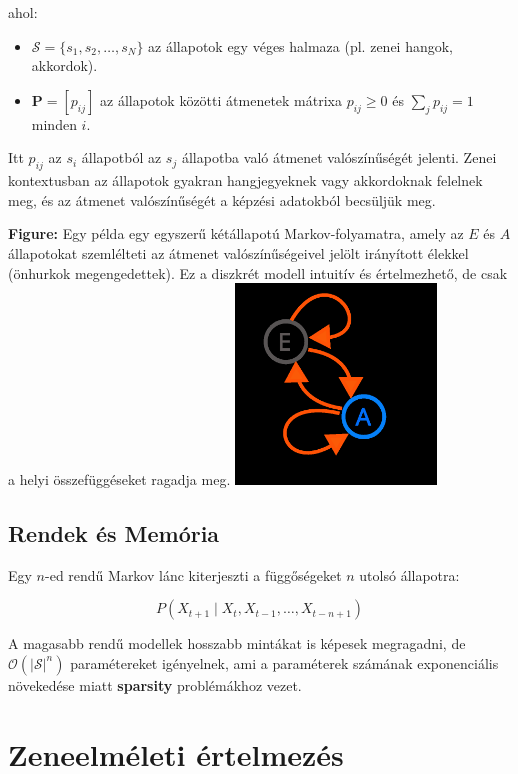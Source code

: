 ahol:
\begin{itemize}
    \item \( \mathcal{S} = \{s_1, s_2, \dots, s_N\} \) az állapotok egy véges halmaza (pl. zenei hangok, akkordok).
    \item \( \mathbf{P} = [p_{ij}] \) az állapotok közötti átmenetek mátrixa \( p_{ij} \geq 0 \) és \( \sum_j p_{ij} = 1 \) minden \( i \).
\end{itemize}

Itt \( p_{ij} \) az \( s_i \) állapotból az \( s_j \) állapotba való átmenet valószínűségét jelenti. Zenei kontextusban az állapotok gyakran hangjegyeknek vagy akkordoknak felelnek meg, és az átmenet valószínűségét a képzési adatokból becsüljük meg.

\vspace{1em}
\noindent\textbf{Figure:} Egy példa egy egyszerű kétállapotú Markov-folyamatra, amely az \( E \) és \( A \) állapotokat szemlélteti az átmenet valószínűségeivel jelölt irányított élekkel (önhurkok megengedettek). Ez a diszkrét modell intuitív és értelmezhető, de csak a helyi összefüggéseket ragadja meg. \hfill
\includegraphics[width=0.4\textwidth]{images/markov.png}
\label{fig:markov}
\vspace{1em}

\subsection{Rendek és Memória}

Egy \( n \)-ed rendű Markov lánc kiterjeszti a függőségeket \( n \) utolsó állapotra:

\[
P(X_{t+1} \mid X_t, X_{t-1}, \dots, X_{t-n+1})
\]

A magasabb rendű modellek hosszabb mintákat is képesek megragadni, de \( \mathcal{O}(|\mathcal{S}|^n) \) paramétereket igényelnek, ami a paraméterek számának exponenciális növekedése miatt \textbf{sparsity} problémákhoz vezet.

\section{Zeneelméleti értelmezés}

